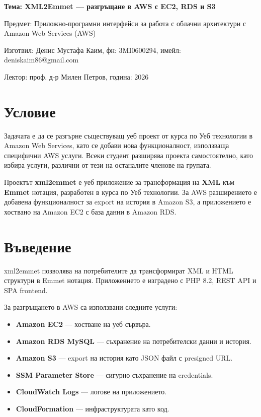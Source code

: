 \documentclass[12pt]{article}
\begin{document}
    \begin{center}
        \LARGE{\textbf{Тема: XML2Emmet — разгръщане в AWS с EC2, RDS и S3}}

        \bigskip
        \Large{Предмет: Приложно-програмни интерфейси за работа с облачни архитектури с Amazon Web Services (AWS)}

        \medskip
        \Large{Изготвил: Денис Мустафа Каим, фн: 3MI0600294, имейл: deniskaim86@gmail.com}

        \medskip
        \Large{Лектор: проф. д-р Милен Петров, година: 2026}

        \bigskip
    \end{center}

    \tableofcontents
    \bigskip
    \newpage


\section{Условие}

\noindent Задачата е да се разгърне съществуващ уеб проект от курса по Уеб технологии в Amazon Web Services, като се добави нова функционалност, използваща специфични AWS услуги. Всеки студент разширява проекта самостоятелно, като избира услуги, различни от тези на останалите членове на групата.

\medskip

\noindent Проектът \textbf{xml2emmet} е уеб приложение за трансформация на \textbf{XML} към \textbf{Emmet} нотация, разработен в курса по Уеб технологии. За AWS разширението е добавена функционалност за export на история в Amazon S3, а приложението е хоствано на Amazon EC2 с база данни в Amazon RDS.


\section{Въведение}

xml2emmet позволява на потребителите да трансформират XML и HTML структури в Emmet нотация. Приложението е изградено с PHP 8.2, REST API и SPA frontend.

\noindent За разгръщането в AWS са използвани следните услуги:

\begin{itemize}
    \item \textbf{Amazon EC2} — хостване на уеб сървъра.

    \item \textbf{Amazon RDS MySQL} — съхранение на потребителски данни и история.

    \item \textbf{Amazon S3} — export на история като JSON файл с presigned URL.

    \item \textbf{SSM Parameter Store} — сигурно съхранение на credentials.

    \item \textbf{CloudWatch Logs} — логове на приложението.

    \item \textbf{CloudFormation} — инфраструктурата като код.
\end{itemize}
\end{document}
